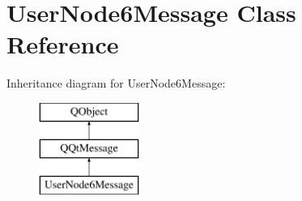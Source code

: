 \hypertarget{class_user_node6_message}{}\section{User\+Node6\+Message Class Reference}
\label{class_user_node6_message}
Inheritance diagram for User\+Node6\+Message\+:\begin{figure}[H]
\begin{center}
\leavevmode
\includegraphics[height=3.000000cm]{class_user_node6_message}
\end{center}
\end{figure}
